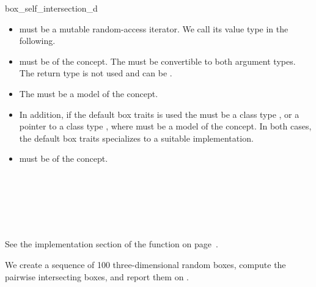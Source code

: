 \begin{ccRefFunction}{box_self_intersection_d}
\begin{itemize}
  \item
     must be a mutable random-access
    iterator. We call its value type  in the following.
  \item
     must be of the  concept. 
    The  must be convertible to both argument types. The
    return type is not used and can be .
  \item
    The  must be a model of the  concept.
  \item
    In addition, if the default box traits is used the  must be 
    a class type , or a pointer to a class type , where
     must be a model of the  concept.
    In both cases, the default box traits specializes to a suitable
    implementation.
  \item
     must be of the  concept.
\end{itemize}

\ccSeeAlso

\\
\\

\\
\\

\ccImplementation

See the implementation section of the 
function on page~.

\ccExample

We create a sequence of 100 three-dimensional random boxes, compute
the pairwise intersecting boxes, and report them on .


\end{ccRefFunction}


